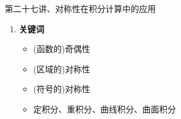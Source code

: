 
\begin{frame}{第二十七讲、对称性在积分计算中的应用}
	\linespread{1.5}
	\begin{enumerate}
	  \item {\bf 关键词}
	  \begin{itemize}
		\item (函数的)奇偶性
		\item (区域的)对称性
		\item (符号的)对称性
		\item 定积分、重积分、曲线积分、曲面积分
	  \vspace{1em}
	  \end{itemize}
	\end{enumerate}
\end{frame}

% 
% 


